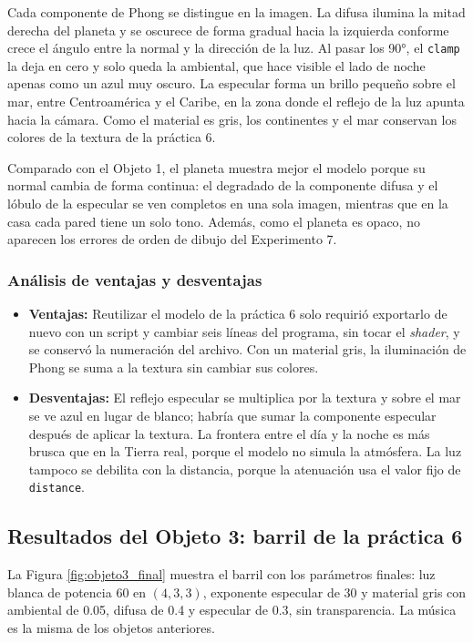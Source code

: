 Cada componente de Phong se distingue en la imagen. La difusa ilumina la mitad derecha del planeta y se oscurece de forma gradual hacia la izquierda conforme crece el ángulo entre la normal y la dirección de la luz. Al pasar los 90°, el \texttt{clamp} la deja en cero y solo queda la ambiental, que hace visible el lado de noche apenas como un azul muy oscuro. La especular forma un brillo pequeño sobre el mar, entre Centroamérica y el Caribe, en la zona donde el reflejo de la luz apunta hacia la cámara. Como el material es gris, los continentes y el mar conservan los colores de la textura de la práctica 6.

Comparado con el Objeto 1, el planeta muestra mejor el modelo porque su normal cambia de forma continua: el degradado de la componente difusa y el lóbulo de la especular se ven completos en una sola imagen, mientras que en la casa cada pared tiene un solo tono. Además, como el planeta es opaco, no aparecen los errores de orden de dibujo del Experimento 7.

\subsubsection{Análisis de ventajas y desventajas}
\begin{itemize}
    \item \textbf{Ventajas:} Reutilizar el modelo de la práctica 6 solo requirió exportarlo de nuevo con un script y cambiar seis líneas del programa, sin tocar el \textit{shader}, y se conservó la numeración del archivo. Con un material gris, la iluminación de Phong se suma a la textura sin cambiar sus colores.
    \item \textbf{Desventajas:} El reflejo especular se multiplica por la textura y sobre el mar se ve azul en lugar de blanco; habría que sumar la componente especular después de aplicar la textura. La frontera entre el día y la noche es más brusca que en la Tierra real, porque el modelo no simula la atmósfera. La luz tampoco se debilita con la distancia, porque la atenuación usa el valor fijo de \texttt{distance}.
\end{itemize}

\subsection{Resultados del Objeto 3: barril de la práctica 6}
La Figura \ref{fig:objeto3_final} muestra el barril con los parámetros finales: luz blanca de potencia 60 en $(4, 3, 3)$, exponente especular de 30 y material gris con ambiental de 0.05, difusa de 0.4 y especular de 0.3, sin transparencia. La música es la misma de los objetos anteriores.
 
